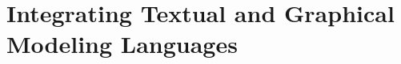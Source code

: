 \chapter{Integrating Textual and Graphical Modeling Languages}
\label{chap:grammars-and-metamodels}



















 